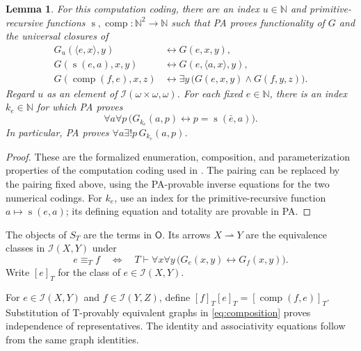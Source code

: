 \documentclass[11pt]{article}
\newtheorem{lemma}[theorem]{Lemma}
\newcommand{\N}{\mathbb N}
\begin{document}
\begin{lemma}\label{lem:arithmetized-evaluation}
For this computation coding, there are an index $u\in\N$ and
primitive-recursive functions
$\operatorname{s},\operatorname{comp}:\N^2\to\N$
such that PA proves functionality
of $G$ and the universal closures of
\begin{align}
 G_u(\langle e,x\rangle,y)
   &\leftrightarrow G(e,x,y),
   \label{eq:arithmetized-universal}\\
 G(\operatorname{s}(e,a),x,y)
   &\leftrightarrow G(e,\langle a,x\rangle,y),
   \label{eq:arithmetized-specialization}\\
 G(\operatorname{comp}(f,e),x,z)
   &\leftrightarrow
     \exists y\,\bigl(G(e,x,y)\land G(f,y,z)\bigr).
   \label{eq:composition}
\end{align}
Regard $u$ as an element of $\mathcal I(\omega\times\omega,\omega)$.
For each fixed $e\in\N$, there is an index
$k_e\in\N$ for which PA proves
\[
 \forall a\forall p\,
 \bigl(G_{k_e}(a,p)\leftrightarrow
       p=\operatorname{s}(\bar e,a)\bigr).
\]
In particular, PA proves $\forall a\exists!p\,G_{k_e}(a,p)$.
\end{lemma}
\begin{proof}
These are the formalized enumeration, composition, and
parameterization properties of the computation coding used in
\cite[p.~108; p.~115, Note~1]{Montagna}.
The pairing can be replaced by the pairing fixed above, using
the PA-provable inverse equations for the two numerical codings.
For $k_e$, use an index for the primitive-recursive function
$a\mapsto\operatorname{s}(e,a)$; its defining equation and
totality are provable in PA.
\end{proof}

The objects of $S_T$ are the terms in $\mathsf O$. Its arrows
$X\rightharpoonup Y$ are the equivalence classes in
$\mathcal I(X,Y)$ under
\begin{equation}\label{eq:uniform}
 e\equiv_T f
 \quad\Longleftrightarrow\quad
 T\vdash \forall x\forall y\,
       \bigl(G_e(x,y)\leftrightarrow G_f(x,y)\bigr).
\end{equation}
Write $[e]_T$ for the class of $e\in\mathcal I(X,Y)$.

For $e\in\mathcal I(X,Y)$ and $f\in\mathcal I(Y,Z)$, define
$[f]_T[e]_T=[\operatorname{comp}(f,e)]_T$.
Substitution of T-provably equivalent graphs in
\eqref{eq:composition} proves independence of representatives.
The identity and associativity equations follow from the same
graph identities.
\end{document}
